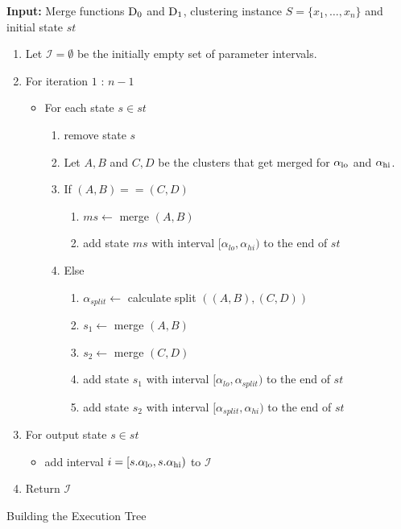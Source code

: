 \begin{algorithm}
    \textbf{Input:} Merge functions $\operatorname{D_{0}}$ and $\operatorname{D_{1}}$, clustering instance $S = \{x_1, \dots, x_n\}$ and initial state $st$
    \begin{enumerate}[nosep, leftmargin=*]
    \item Let $\mathcal{I} = \emptyset$ be the initially empty set of parameter intervals.
    \item For iteration $1$ : $n-1$
        \begin{itemize}[nosep, leftmargin=*]
        \item For each state $s \in st$
            \begin{enumerate}[nosep, leftmargin=*]
                \item remove state $s$
                \item Let $A, B$ and $C, D$ be the clusters that get merged for $\alpha_\text{lo}$ and $\alpha_\text{hi}$.
                \item If $(A,B) == (C,D)$
                \begin{enumerate}[nosep, leftmargin=*]
                    \item $ms \gets$ merge $(A, B)$\;
                    \item add state $ms$ with interval $[\alpha_{lo},\alpha_{hi})$ to the end of $st$
                \end{enumerate}
                \item Else
                \begin{enumerate}[nosep, leftmargin=*]
                    \item $\alpha_{split} \gets$ calculate split $((A, B), (C, D))$
                    \item $s_1 \gets$ merge $(A,B)$
                    \item $s_2 \gets$ merge $(C, D)$
                    \item add state $s_1$ with interval $[\alpha_{lo},\alpha_{split})$ to the end of $st$
                    \item add state $s_2$ with interval $[\alpha_{split},\alpha_{hi})$ to the end of $st$
                \end{enumerate}
            \end{enumerate}
        \end{itemize}
        \item For output state $s \in st$
            \begin{itemize}
                \item add interval $i = [s.\alpha_\text{lo}, s.\alpha_\text{hi})$ to $\mathcal{I}$
            \end{itemize}
        \item Return $\mathcal{I}$
    \end{enumerate}  
    \caption{Building the Execution Tree}
    \label{alg:alphalinkage1}
\end{algorithm}

